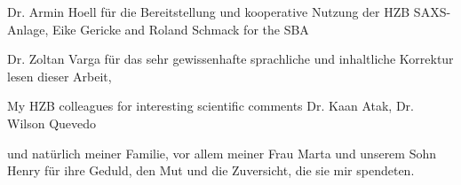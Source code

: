 \noindent Dr. Armin Hoell für die Bereitstellung und kooperative Nutzung der HZB SAXS-Anlage, Eike Gericke and Roland Schmack for the SBA
\vspace{2ex}

\noindent Dr. Zoltan Varga für das sehr gewissenhafte sprachliche und inhaltliche Korrektur lesen dieser Arbeit,
\vspace{2ex}

\noindent My HZB colleagues for interesting scientific comments Dr. Kaan Atak, Dr. Wilson Quevedo
\vspace{2ex}

\noindent und natürlich meiner Familie, vor allem meiner Frau Marta und unserem Sohn Henry für ihre Geduld, den Mut und die Zuversicht, die sie mir spendeten.


\cleardoublepage
